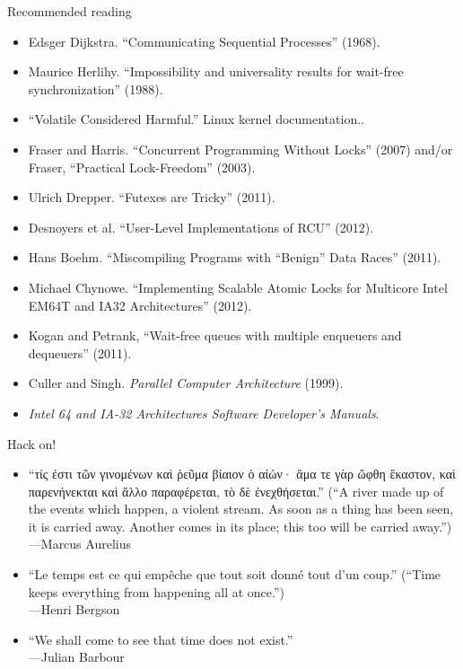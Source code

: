 \documentclass[mathserif,xcolor={dvipsnames,table}]{beamer}
\begin{document}
\begin{frame}{Recommended reading}
\footnotesize{
\begin{itemize}
\item Edsger Dijkstra. ``Communicating Sequential Processes'' (1968).
\item Maurice Herlihy. ``Impossibility and universality results for wait-free synchronization'' (1988).
\item ``Volatile Considered Harmful.'' Linux kernel documentation..
\item Fraser and Harris. ``Concurrent Programming Without Locks'' (2007) and/or Fraser,
	``Practical Lock-Freedom'' (2003).
\item Ulrich Drepper. ``Futexes are Tricky'' (2011).
\item Desnoyers et al. ``User-Level Implementations of RCU'' (2012).
\item Hans Boehm. ``Miscompiling Programs with ``Benign'' Data Races'' (2011).
\item Michael Chynowe. ``Implementing Scalable Atomic Locks for Multicore Intel EM64T and IA32 Architectures'' (2012).
\item Kogan and Petrank, ``Wait-free queues with multiple enqueuers and dequeuers'' (2011).
\item Culler and Singh. \textit{Parallel Computer Architecture} (1999). 
\item \textit{Intel 64 and IA-32 Architectures Software Developer's Manuals}.
\end{itemize}
}
\end{frame}

\begin{frame}{Hack on!}
\begin{itemize}
\item `` τίς ἐστι τῶν γινομένων καὶ ῥεῦμα βίαιον ὁ αἰών· ἅμα
τε γὰρ ὤφθη ἕκαστον, καὶ παρενήνεκται καὶ ἄλλο παραφέρεται, τὸ δὲ
ἐνεχθήσεται.\latintext'' (``A river made up of the events which
happen, a violent stream. As soon as a thing has been seen, it is
carried away. Another comes in its place; this too will be carried away.'')\\ \hfill---Marcus Aurelius
\vfill
\item {}``Le temps est ce qui empêche que tout soit donné tout d'un coup.'' \latintext (``Time
	keeps everything from happening all at once.'')\\ \hfill---Henri Bergson
\vfill
\item ``We shall come to see that time does not exist.''\\ \hfill---Julian Barbour
\end{itemize}
\end{frame}
\end{document}

